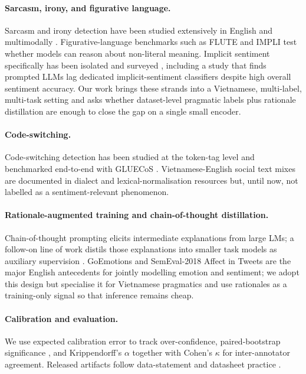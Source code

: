 \paragraph{Sarcasm, irony, and figurative language.}
Sarcasm and irony detection have been studied extensively in English
\citep{ghosh2017role,ghosh2018sarcasmreasons,joshi2017sarcasmsurvey,vandehey2018irony,barbieri2020tweeteval}
and multimodally \citep{cai2019multimodal}. Figurative-language
benchmarks such as FLUTE \citep{chakrabarty2022figurative} and
IMPLI \citep{stowe2022impli} test whether models can reason about
non-literal meaning. Implicit sentiment specifically has been
isolated and surveyed
\citep{liao2024implicitsurvey,li2021dualgraph,liu2023chatgptimplicit},
including a study that finds prompted LLMs lag dedicated implicit-sentiment
classifiers despite high overall sentiment accuracy. Our work brings
these strands into a Vietnamese, multi-label, multi-task setting and
asks whether dataset-level pragmatic labels plus rationale
distillation are enough to close the gap on a single small encoder.

\paragraph{Code-switching.}
Code-switching detection has been studied at the token-tag level
\citep{solorio2014overview} and benchmarked end-to-end with
GLUECoS \citep{khanuja2020gluecos}. Vietnamese-English social text
mixes are documented in dialect and lexical-normalisation resources
\citep{vimd2024,vlexnorm2024} but, until now, not labelled as a
sentiment-relevant phenomenon.

\paragraph{Rationale-augmented training and chain-of-thought distillation.}
Chain-of-thought prompting \citep{wei2022cot} elicits intermediate
explanations from large LMs; a follow-on line of work distils those
explanations into smaller task models as auxiliary supervision
\citep{hsieh2023distillstep,magister2023teaching,shridhar2023distillingcot,hinton2015distillation}.
GoEmotions \citep{demszky2020goemotions} and SemEval-2018 Affect in
Tweets \citep{mohammad2018semeval} are the major English antecedents
for jointly modelling emotion and sentiment; we adopt this design but
specialise it for Vietnamese pragmatics and use rationales as a
training-only signal so that inference remains cheap.

\paragraph{Calibration and evaluation.}
We use expected calibration error \citep{guo2017calibration,naeini2015ece}
to track over-confidence, paired-bootstrap significance
\citep{koehn2004bootstrap}, and Krippendorff's $\alpha$
\citep{krippendorff2011alpha} together with Cohen's
$\kappa$ \citep{cohen1960kappa} for inter-annotator agreement.
Released artifacts follow data-statement and datasheet practice
\citep{bender2018datastatements,gebru2021datasheets,mitchell2019modelcards,bender2021stochastic}.
